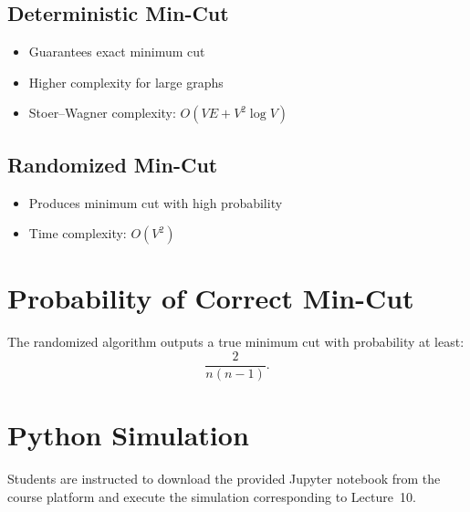 \documentclass[12pt]{article}
\begin{document}
\subsection{Deterministic Min-Cut}
\begin{itemize}
    \item Guarantees exact minimum cut
    \item Higher complexity for large graphs
    \item Stoer--Wagner complexity: $O(VE + V^2 \log V)$
\end{itemize}

\subsection{Randomized Min-Cut}
\begin{itemize}
    \item Produces minimum cut with high probability
    \item Time complexity: $O(V^2)$
\end{itemize}

\section{Probability of Correct Min-Cut}
The randomized algorithm outputs a true minimum cut with probability at least:
\[
\frac{2}{n(n-1)}.
\]

\section{Python Simulation}
Students are instructed to download the provided Jupyter notebook from the course platform and execute the simulation corresponding to Lecture~10.
\end{document}
